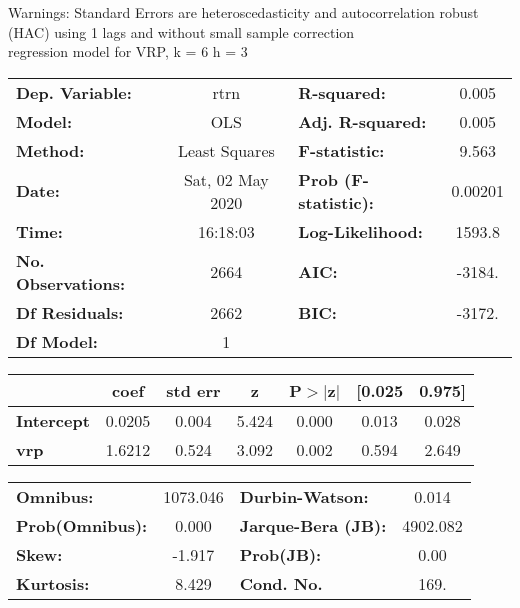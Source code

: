 Warnings: \newline
 [1] Standard Errors are heteroscedasticity and autocorrelation robust (HAC) using 1 lags and without small sample correction\\ 

regression model for VRP, k = 6 h = 3\begin{center}
\begin{tabular}{lclc}
\toprule
\textbf{Dep. Variable:}    &       rtrn       & \textbf{  R-squared:         } &     0.005   \\
\textbf{Model:}            &       OLS        & \textbf{  Adj. R-squared:    } &     0.005   \\
\textbf{Method:}           &  Least Squares   & \textbf{  F-statistic:       } &     9.563   \\
\textbf{Date:}             & Sat, 02 May 2020 & \textbf{  Prob (F-statistic):} &  0.00201    \\
\textbf{Time:}             &     16:18:03     & \textbf{  Log-Likelihood:    } &    1593.8   \\
\textbf{No. Observations:} &        2664      & \textbf{  AIC:               } &    -3184.   \\
\textbf{Df Residuals:}     &        2662      & \textbf{  BIC:               } &    -3172.   \\
\textbf{Df Model:}         &           1      & \textbf{                     } &             \\
\bottomrule
\end{tabular}
\begin{tabular}{lcccccc}
                   & \textbf{coef} & \textbf{std err} & \textbf{z} & \textbf{P$> |$z$|$} & \textbf{[0.025} & \textbf{0.975]}  \\
\midrule
\textbf{Intercept} &       0.0205  &        0.004     &     5.424  &         0.000        &        0.013    &        0.028     \\
\textbf{vrp}       &       1.6212  &        0.524     &     3.092  &         0.002        &        0.594    &        2.649     \\
\bottomrule
\end{tabular}
\begin{tabular}{lclc}
\textbf{Omnibus:}       & 1073.046 & \textbf{  Durbin-Watson:     } &    0.014  \\
\textbf{Prob(Omnibus):} &   0.000  & \textbf{  Jarque-Bera (JB):  } & 4902.082  \\
\textbf{Skew:}          &  -1.917  & \textbf{  Prob(JB):          } &     0.00  \\
\textbf{Kurtosis:}      &   8.429  & \textbf{  Cond. No.          } &     169.  \\
\bottomrule
\end{tabular}
\end{center}

